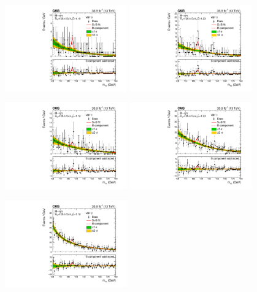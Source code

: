 \begin{figure}[h!]
    \begin{center}
        \includegraphics[width=0.47\textwidth]{figures/stats_results/CMS-HIG-16-040_Figure_012-a.pdf}
        \includegraphics[width=0.47\textwidth]{figures/stats_results/SBplots_jackWSnewVBFTag_0_13TeV.pdf}
    \end{center}
    \begin{center}
        \includegraphics[width=0.47\textwidth]{figures/stats_results/CMS-HIG-16-040_Figure_012-b.pdf}
        \includegraphics[width=0.47\textwidth]{figures/stats_results/SBplots_jackWSnewVBFTag_1_13TeV.pdf}
    \end{center}
    \begin{center}
        \includegraphics[width=0.47\textwidth]{figures/stats_results/CMS-HIG-16-040_Figure_012-c.pdf}

\end{center}
\end{figure}
